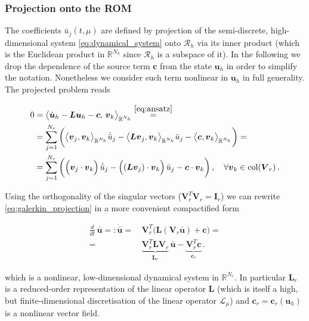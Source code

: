 \documentclass[../main.tex]{subfiles}
\begin{document}
\subsubsection{Projection onto the ROM}\label{subsubsec:projection}

The coefficients $\bar{u}_{j}(t,\mu)$ are defined by projection of the semi-discrete, high-dimensional system \eqref{eq:dynamical_system} onto $\mathcal{R}_{h}$ via its inner product (which is the Euclidean product in $\mathbb{R}^{N_{h}}$ since $\mathcal{R}_{h}$ is a subspace of it).
In the following we drop the dependence of the source term $\boldsymbol{c}$ from the state $\boldsymbol{u}_{h}$ in order to simplify the notation.
Nonetheless we consider such term nonlinear in $\boldsymbol{u}_{h}$ in full generality.
The projected problem reads

\begin{align}
     0 &= \big\langle \dot{\boldsymbol{u}}_{h} - \boldsymbol{L}\boldsymbol{u}_{h} - \boldsymbol{c},\,\boldsymbol{v}_{k}\big\rangle_{\mathbb{R}^{N_{h}}} \stackrel{\eqref{eq:ansatz}}{=} \nonumber \\ 
       &= \sum_{j=1}^{N_{r}}\bigg(\big\langle\boldsymbol{v}_{j},\boldsymbol{v}_{k}\big\rangle_{\mathbb{R}^{N_{h}}}\dot{\bar{u}}_{j} - \big\langle\boldsymbol{L}\boldsymbol{v}_{j},\boldsymbol{v}_{k}\big\rangle_{\mathbb{R}^{N_{h}}}\bar{u}_{j} - \big\langle\boldsymbol{c},\boldsymbol{v}_{k}\big\rangle_{\mathbb{R}^{N_{h}}}\bigg) = \nonumber \\
       &= \sum_{j=1}^{N_{r}}\bigg(\Big(\boldsymbol{v}_{j}\cdot\boldsymbol{v}_{k}\Big)\,\dot{\bar{u}}_{j} - \Big((\boldsymbol{L}\boldsymbol{v}_{j})\cdot\boldsymbol{v}_{k}\Big)\,\bar{u}_{j} - \boldsymbol{c}\cdot\boldsymbol{v}_{k}\bigg)\,,\quad\forall\boldsymbol{v}_{k}\in\text{col}(\boldsymbol{V}_{r})\,. \label{eq:galerkin_projection}
\end{align}

Using the orthogonality of the singular vectors ($\boldsymbol{V}_{r}^{T}\boldsymbol{V}_{r}=\boldsymbol{I}_{r}$) we can rewrite \eqref{eq:galerkin_projection} in a more convenient compactified form

\begin{align}\label{eq:reduced_dynamical_system}
        \frac{d}{dt}\,\bar{\boldsymbol{u}} =: \dot{\bar{\boldsymbol{u}}} =& \, \boldsymbol{V}_{r}^{T}\Big(\boldsymbol{L}(\boldsymbol{V}_{r}\bar{\boldsymbol{u}}) + \boldsymbol{c}\Big) = \nonumber \\
        =& \, \underbrace{\boldsymbol{V}_{r}^{T}\boldsymbol{L}\boldsymbol{V}_{r}}_{\boldsymbol{L}_{r}}\,\boldsymbol{\bar{u}} - \underbrace{\boldsymbol{V}_{r}^{T}\boldsymbol{c}}_{\boldsymbol{c}_{r}}\,. 
\end{align}

which is a nonlinear, low-dimensional dynamical system in $\mathbb{R}^{N_{r}}$.
In particular $\boldsymbol{L}_{r}$ is a reduced-order representation of the linear operator $\boldsymbol{L}$ (which is itself a high, but finite-dimensional discretisation of the linear operator $\mathcal{L}_{\mu}$) and $\boldsymbol{c}_{r} = \boldsymbol{c}_{r}(\boldsymbol{u}_{h})$ is a nonlinear vector field.
\end{document}
